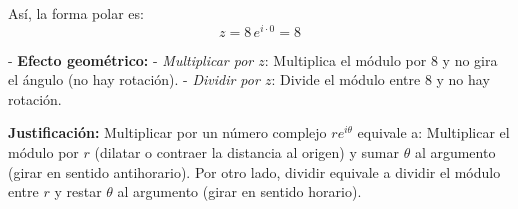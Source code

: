 \begin{prob}
\begin{myproof}
  Así, la forma polar es:
  \[
  z = 8\, e^{i\cdot 0} = 8
  \]

- \textbf{Efecto geométrico:}
  - \textit{Multiplicar por $z$}: Multiplica el módulo por $8$ y no gira el ángulo (no hay rotación).
  - \textit{Dividir por $z$}: Divide el módulo entre $8$ y no hay rotación.

\vspace{1em}

\textbf{Justificación:}  
Multiplicar por un número complejo $re^{i\theta}$ equivale a: Multiplicar el módulo por $r$ (dilatar o contraer la distancia al origen) y sumar $\theta$ al argumento (girar en sentido antihorario). Por otro lado, dividir equivale a dividir el módulo entre $r$ y restar $\theta$ al argumento (girar en sentido horario).

\end{myproof}

\end{prob}

